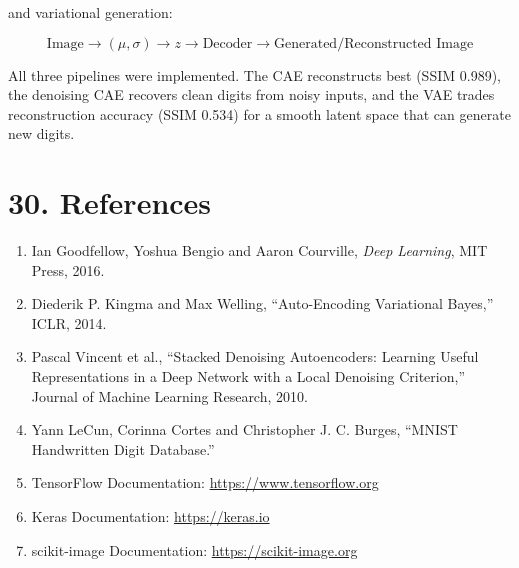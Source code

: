 \documentclass[10pt]{article}
\begin{document}
and variational generation:

\[
\boxed{
\text{Image}
\rightarrow
(\mu,\sigma)
\rightarrow
z
\rightarrow
\text{Decoder}
\rightarrow
\text{Generated/Reconstructed Image}
}
\]

All three pipelines were implemented. The CAE reconstructs best (SSIM 0.989), the denoising CAE recovers clean digits from noisy inputs, and the VAE trades reconstruction accuracy (SSIM 0.534) for a smooth latent space that can generate new digits.

\section*{30. References}

\begin{enumerate}
\item Ian Goodfellow, Yoshua Bengio and Aaron Courville,
\emph{Deep Learning}, MIT Press, 2016.

\item Diederik P. Kingma and Max Welling,
``Auto-Encoding Variational Bayes,'' ICLR, 2014.

\item Pascal Vincent et al.,
``Stacked Denoising Autoencoders: Learning Useful Representations in a Deep
Network with a Local Denoising Criterion,'' Journal of Machine Learning
Research, 2010.

\item Yann LeCun, Corinna Cortes and Christopher J. C. Burges,
``MNIST Handwritten Digit Database.''

\item TensorFlow Documentation:
\url{https://www.tensorflow.org}

\item Keras Documentation:
\url{https://keras.io}

\item scikit-image Documentation:
\url{https://scikit-image.org}
\end{enumerate}
\end{document}
